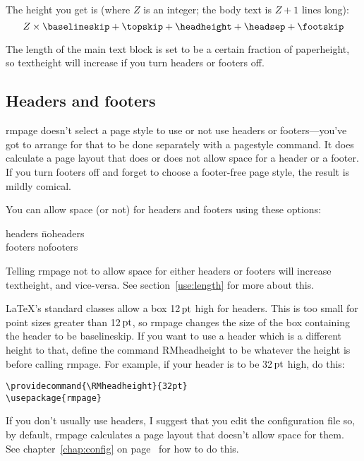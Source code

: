 \documentclass[11pt,loose,twoside,touchwider,longish,
                      noheaders,a4paper,notstdmargins]{report}
\makeatletter
\newcommand*{\unit}[1]{\ifmmode\@unit{\hbox{#1}}\else$\@unit{\hbox{#1}}$\fi}%
\let\units=\unit
\def\@unit#1{{\setbox0=\hbox{#1}\ifdim\wd0<1.125em\,\else\>\fi\box0}}
\DeclareRobustCommand*{\comname}[1]{{\ttfamily\makeatletter\bs #1\makeatother}}
\newcommand*{\classname}[1]{{\ttfamily #1}}
\newcommand*{\optname}[1]{{\ttfamily #1}}
\newcommand*{\rmpage}{\classname{rmpage}\xspace}
\makeatother
\begin{document}
The height you get is (where $Z$ is an integer; the body text is $Z+1$
lines long):
\begin{displaymath}
Z \times \mbox{\comname{baselineskip}} + \mbox{\comname{topskip}} +
\mbox{\comname{headheight}} + \mbox{\comname{headsep}} +
\mbox{\comname{footskip}}
\end{displaymath}

The length of the main text block is set to be a certain fraction of
\comname{paperheight}, so \comname{textheight} will increase  if you
turn headers or footers off.

\subsection{Headers and footers}
\label{use:headfoot}

\rmpage doesn't select a page style to use or not use headers or
footers---you've got to arrange for that to be done separately with a
\comname{pagestyle} command.  It does calculate a page layout that does
or does not allow space for a header or a footer.  If you turn
footers off and forget to choose a footer-free page style, the result
is mildly comical.

You can allow space (or not) for headers and footers using these
options:
\begin{tabbing}
\optname{headers} \= \optname{noheaders} \\
\optname{footers} \> \optname{nofooters}
\end{tabbing}
Telling \rmpage not to allow space for either headers or footers will increase
\comname{textheight}, and vice-versa.  See section~\ref{use:length}
for more about this.

\LaTeX's standard classes allow a box 12\units{pt} high for headers.
This is too small for point sizes greater than 12\units{pt}, so
\rmpage changes the size of the box containing the header to be
\comname{baselineskip}.  If you want to use a header which is a
different height to that, define the command \comname{RMheadheight} to
be whatever the height is before calling \rmpage.  For example, if
your header is to be 32\units{pt} high, do this:
\begin{verbatim}
\providecommand{\RMheadheight}{32pt}
\usepackage{rmpage}
\end{verbatim}

If you don't usually use headers, I suggest that you edit the
configuration file so, by default, \rmpage calculates a page layout
that doesn't allow space for them.  See chapter~\ref{chap:config} on
page~\pageref{chap:config} for how to do this.
\end{document}
